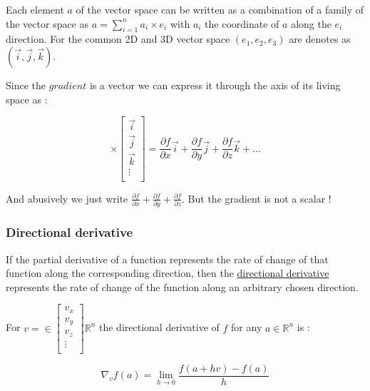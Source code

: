\documentclass[12pt]{article}
\begin{document}
Each element $a$ of the vector space can be written as a combination of a family of the vector space as $a = \sum_{i=1}^{n} a_i \times e_i$ with $a_i$ the coordinate of $a$ along the $e_i$ direction. For the common 2D and 3D vector space $(e_1, e_2, e_3)$ are denotes as $(\vec{i}, \vec{j}, \vec{k})$.

Since the $gradient$ is a vector we can express it through the axis of its living space as :

\begin{equation*}
[\frac{\partial{f}}{\partial{x}}, \frac{\partial{f}}{\partial{y}}, \frac{\partial{f}}{\partial{z}},...] 
\times
\begin{bmatrix}
    \vec{i} \\
    \vec{j} \\
    \vec{k} \\
    \vdots \\
\end{bmatrix}
= \frac{\partial{f}}{\partial{x}}\vec{i} + \frac{\partial{f}}{\partial{y}}\vec{j} + \frac{\partial{f}}{\partial{z}}\vec{k} + ...
\end{equation*}

And abusively we just write $\frac{\partial{f}}{\partial{x}} + \frac{\partial{f}}{\partial{y}} + \frac{\partial{f}}{\partial{z}}$. But the gradient is not a scalar !


\subsubsection{Directional derivative}

If the partial derivative of a function represents the rate of change of that function along the corresponding direction, then the \href{https://www.youtube.com/watch?v=N_ZRcLheNv0&ab_channel=KhanAcademy}{directional derivative} represents the rate of change of the function along an arbitrary chosen direction.

For 
$v= \in \begin{bmatrix}
    v_x \\
    v_y \\
    v_z \\
    \vdots \\
\end{bmatrix} \mathbb{R}^n$ 
the directional derivative of $f$ for any $a \in \mathbb{R}^n$ is :

$$
\nabla_{v}f(a) = \lim_{h \rightarrow 0} \frac{f(a+hv)-f(a)}{h}
$$
\end{document}
